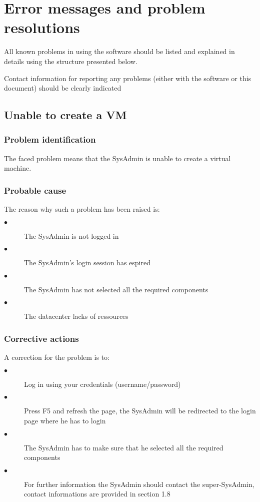 
\chapter{Error messages and problem resolutions}
\label{chap:error_messages}

All known problems in using the software should be listed and explained in
details using the structure presented below.

Contact information for reporting any problems (either with the software or
this document) should be clearly indicated


\section{Unable to create a VM}

\subsection{Problem identification}
The faced problem means that the SysAdmin is unable to create a virtual machine.

\subsection{Probable cause}

The reason why such a problem has been raised is:\\
\begin{description}
  \item[$\bullet$] The SysAdmin is not logged in
  \item[$\bullet$] The SysAdmin's login session has espired
  \item[$\bullet$] The SysAdmin has not selected all the required components
  \item[$\bullet$] The datacenter lacks of ressources
\end{description}


\subsection{Corrective actions}

A correction for the problem is to:\\
\begin{description}
  \item[$\bullet$] Log in using your credentials (username/password)
  \item[$\bullet$] Press F5 and refresh the page, the SysAdmin will be redirected to
  the login page where he has to login
  \item[$\bullet$] The SysAdmin has to make sure that he selected all the required
  components
  \item[$\bullet$] For further information the SysAdmin should contact the
  super-SysAdmin, contact informations are provided in section 1.8
\end{description}


